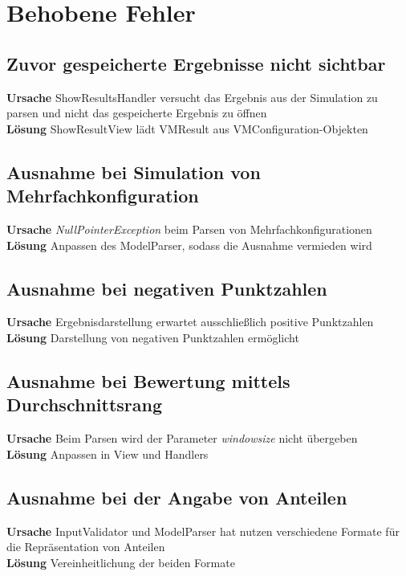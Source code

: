 \section{Behobene Fehler}

\subsection{Zuvor gespeicherte Ergebnisse nicht sichtbar}

\textbf{Ursache} ShowResultsHandler versucht das Ergebnis aus der Simulation zu parsen und nicht das gespeicherte Ergebnis zu öffnen\\
\textbf{Lösung} ShowResultView lädt VMResult aus VMConfiguration-Objekten

\subsection{Ausnahme bei Simulation von Mehrfachkonfiguration}

\textbf{Ursache} \emph{NullPointerException} beim Parsen von Mehrfachkonfigurationen\\
\textbf{Lösung} Anpassen des ModelParser, sodass die Ausnahme vermieden wird

\subsection{Ausnahme bei negativen Punktzahlen}

\textbf{Ursache} Ergebnisdarstellung erwartet ausschließlich positive Punktzahlen\\
\textbf{Lösung} Darstellung von negativen Punktzahlen ermöglicht

\subsection{Ausnahme bei Bewertung mittels Durchschnittsrang}

\textbf{Ursache} Beim Parsen wird der Parameter \emph{windowsize} nicht übergeben\\
\textbf{Lösung} Anpassen in View und Handlers

\subsection{Ausnahme bei der Angabe von Anteilen}

\textbf{Ursache} InputValidator und ModelParser hat nutzen verschiedene Formate für die Repräsentation von Anteilen\\
\textbf{Lösung} Vereinheitlichung der beiden Formate

